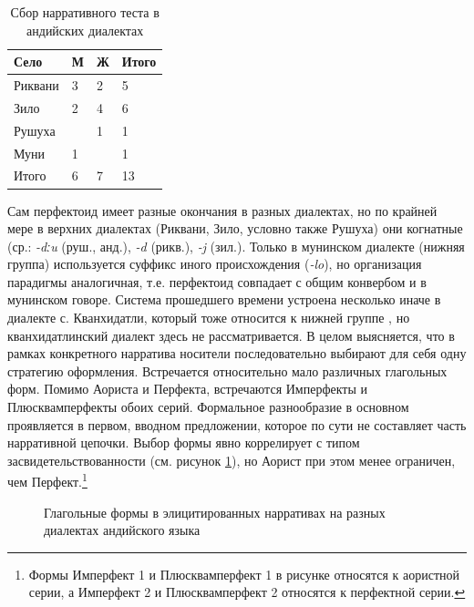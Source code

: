 \begin{table}[H]
\caption{Сбор нарративного теста в андийских диалектах}
\label{tab:andispeakers}
\vspace{0.5cm}
\begin{center}
\begin{tabular}{l|ll|l}
Село    & М & Ж & Итого \\ \hline
Риквани & 3 & 2 & 5     \\
Зило    & 2 & 4 & 6     \\
Рушуха  &   & 1 & 1     \\
Муни    & 1 &   & 1     \\ \hline
Итого   & 6 & 7 & 13   
\end{tabular}
\end{center}
\end{table}

Сам перфектоид имеет разные окончания в разных диалектах, но по крайней мере в верхних диалектах (Риквани, Зило, условно также Рушуха) они когнатные (ср.: \textit{-dːu} (руш., анд.), \textit{-d} (рикв.), \textit{-j} (зил.). Только в мунинском диалекте (нижняя группа) используется суффикс иного происхождения (\textit{-lo}), но организация парадигмы аналогичная, т.е. перфектоид совпадает с общим конвербом и в мунинском говоре. Система прошедшего времени устроена несколько иначе в диалекте с. Кванхидатли, который тоже относится к нижней группе \citep{verhees2019}, но кванхидатлинский диалект здесь не рассматривается. В целом выясняется, что в рамках конкретного нарратива носители последовательно выбирают для себя одну стратегию оформления. Встречается относительно мало различных глагольных форм. Помимо Аориста и Перфекта, встречаются Имперфекты и Плюсквамперфекты обоих серий. Формальное разнообразие в основном проявляется в первом, вводном предложении, которое по сути не составляет часть нарративной цепочки. Выбор формы явно коррелирует с типом засвидетельствованности (см. рисунок \ref{fig:nartest}), но Аорист при этом менее ограничен, чем Перфект.\footnote{Формы Имперфект 1 и Плюсквамперфект 1 в рисунке относятся к аористной серии, а Имперфект 2 и Плюсквамперфект 2 относятся к перфектной серии.}

\begin{figure}[h]
\centering
\caption{Глагольные формы в элицитированных нарративах на разных диалектах андийского языка}
\vspace{0.5cm}
\label{fig:nartest}
\end{figure}

